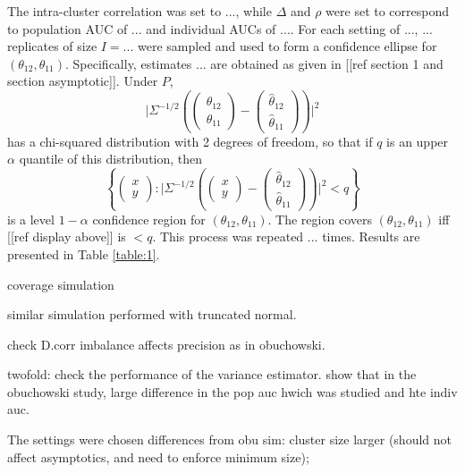 \message{ !name(manuscript.tex)}\documentclass[12pt]{article}
\DeclareMathOperator{\AUC}{AUC}
\newcommand{\cind}{\perp \!\!\! \perp}
\newcommand{\aucindiv}{\theta_{11}}%
\newcommand{\aucpop}{\theta_{12}}%
\newcommand{\aucindivhat}{\hat{\theta}_{11}}%
\newcommand{\aucpophat}{\hat{\theta}_{12}}%
\begin{document}
The intra-cluster correlation was set to $...$, while $\Delta$ and
$\rho$ were set to correspond to population AUC of $...$ and
individual AUCs of $...$. For each setting of $...$, $...$ replicates
of size $I=...$ were sampled and used to form a confidence ellipse for
$(\aucpop,\aucindiv)$. Specifically, estimates ... are obtained as
given in [[ref section 1 and section asymptotic]]. Under $P$,
$$
\bigg\vert\Sigma^{-1/2}\left(\begin{pmatrix}\aucpop\\
\aucindiv\end{pmatrix}-\begin{pmatrix}\aucpophat\\\aucindivhat\end{pmatrix}\right)\bigg\vert^2
$$
has a chi-squared distribution with 2 degrees of freedom, so that if
$q$ is an upper $\alpha$ quantile of this distribution, then
$$
\left\{\begin{pmatrix}x\\y\end{pmatrix}:\bigg\vert\Sigma^{-1/2}\left(\begin{pmatrix}x\\y\end{pmatrix}-\begin{pmatrix}\aucpophat\\\aucindivhat\end{pmatrix}\right)\bigg\vert^2
< q\right\}
$$
is a level $1-\alpha$ confidence region for $(\aucpop,\aucindiv)$. The
region covers $(\aucpop,\aucindiv)$ iff [[ref display above]] is $<q$.
This process was repeated $...$ times. Results are presented in Table
\ref{table:1}.

\begin{table}
  
  \caption{coverage simulation}
  \label{table:1}
\end{table}

similar simulation performed with truncated normal.

check D.corr imbalance affects precision as in obuchowski. 

twofold: check the performance of the variance estimator. show that in
the obuchowski study, large difference in the pop auc hwich was
studied and hte indiv auc.

The settings were chosen differences from obu sim: cluster size larger
(should not affect asymptotics, and need to enforce minimum size);
\end{document}
